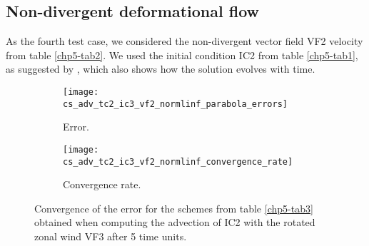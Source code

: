 \subsection{Non-divergent deformational flow}
As the fourth test case, we considered the non-divergent vector field VF2 velocity from table \ref{chp5-tab2}. 
We used the initial condition IC2 from table \ref{chp5-tab1}, as suggested by \citet{nair:2010}, which also shows how the solution evolves with time. 
\begin{figure}[!htb]
	\centering
	\begin{subfigure}{0.42\textwidth}
		\centering
		\texttt{[image: cs\_adv\_tc2\_ic3\_vf2\_normlinf\_parabola\_errors]}
		\caption{Error.\label{chp5-adv3-error}}
	\end{subfigure}
	\begin{subfigure}{0.42\textwidth}
		\centering
		\texttt{[image: cs\_adv\_tc2\_ic3\_vf2\_normlinf\_convergence\_rate]}
		\caption{Convergence rate.\label{chp5-adv3-cr}}
	\end{subfigure}
	\caption{Convergence of the error for the schemes from table \ref{chp5-tab3} obtained when computing the advection of IC2  with the rotated zonal wind VF3 after 5 time units.
		\label{chp5-error-adv3}}
\end{figure}

